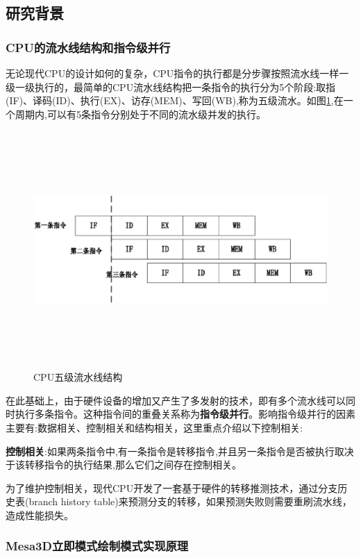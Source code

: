 
\subsection{研究背景}

\subsubsection{CPU的流水线结构和指令级并行}

无论现代CPU的设计如何的复杂，CPU指令的执行都是分步骤按照流水线一样一级一级执行的，最简单的CPU流水线结构把一条指令的执行分为5个阶段:取指(IF)、译码(ID)、执行(EX)、访存(MEM)、写回(WB),称为五级流水\cite{huweiwu}。如图\ref{fig:cpu-pipeline},在一个周期内,可以有5条指令分别处于不同的流水级并发的执行。

\begin{figure}[H] 
  \centering
  \includegraphics[width=16cm,height=9cm]{figures/chap03/cpu-pipeline}
  \caption{CPU五级流水线结构}
  \label{fig:cpu-pipeline}
\end{figure}

在此基础上，由于硬件设备的增加又产生了多发射的技术，即有多个流水线可以同时执行多条指令。这种指令间的重叠关系称为\textbf{指令级并行}\cite{Quantitative}。影响指令级并行的因素主要有:数据相关、控制相关和结构相关，这里重点介绍以下控制相关:

\textbf{控制相关}:如果两条指令中,有一条指令是转移指令,并且另一条指令是否被执行取决于该转移指令的执行结果,那么它们之间存在控制相关。

为了维护控制相关，现代CPU开发了一套基于硬件的转移推测技术，通过分支历史表(branch history table)来预测分支的转移，如果预测失败则需要重刷流水线，造成性能损失。


\subsubsection{Mesa3D立即模式绘制模式实现原理}


